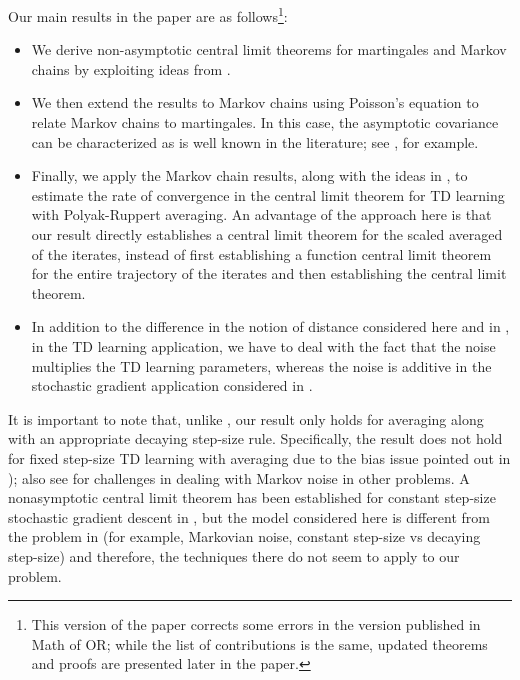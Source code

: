 \documentclass[11pt]{article}
\begin{document}
Our main results in the paper are as follows\footnote{This version of the paper corrects some errors in the version published in Math of OR; while the list of contributions is the same, updated theorems and proofs are presented later in the paper.}:
\begin{itemize}
    \item We derive non-asymptotic central limit theorems for martingales and Markov chains by exploiting ideas from \citep{rollin2018quantitative,gallouet2018regularity,fang2019multivariate}. 
    \item We then extend the results to Markov chains using Poisson's equation to relate Markov chains to martingales. In this case, the asymptotic covariance can be characterized as is well known in the literature; see \citep{douc2018markov}, for example. 
    \item Finally, we apply the Markov chain results, along with the ideas in \citep{polyak1992acceleration}, to estimate the rate of convergence in the central limit theorem for TD learning with Polyak-Ruppert averaging. An advantage of the approach here is that our result directly establishes a central limit theorem for the scaled averaged of the iterates, instead of first establishing a function central limit theorem for the entire trajectory of the iterates and then establishing the central limit theorem.
    \item In addition to the difference in the notion of distance considered here and in \citep{anastasiou2019normal}, in the TD learning application, we have to deal with the fact that the noise multiplies the TD learning parameters, whereas the noise is additive in the stochastic gradient application considered in \citep{anastasiou2019normal}. 
\end{itemize}

It is important to note that, unlike \citep{polyak1992acceleration}, our result only holds for averaging along with an appropriate decaying step-size rule. Specifically, the result does not hold for fixed step-size TD learning with averaging due to the bias issue pointed out in \citep{borkar2021ode,lauand2023curse,huo2023bias}); also see \citep{nagaraj2020least,roy2023online,jain2018parallelizing} for challenges in dealing with Markov noise in other problems. A nonasymptotic central limit theorem has been established for constant step-size stochastic gradient descent in \citep{dieuleveut2020bridging}, but the model considered here is different from the problem in \citep{dieuleveut2020bridging} (for example, Markovian noise, constant step-size vs decaying step-size) and therefore, the techniques there do not seem to apply to our problem.
\end{document}
